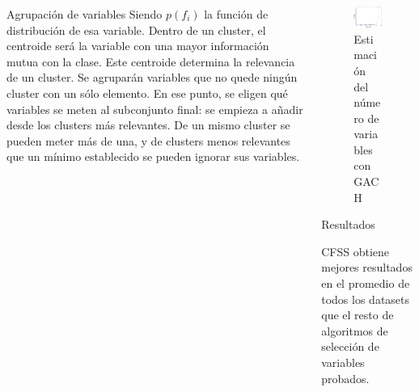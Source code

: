 \documentclass[final]{beamer}
\newlength{\onecolwid}
\newlength{\twocolwid}
\begin{document}
\begin{frame}[t]
\begin{columns}[t]
\begin{column}{\twocolwid}
\begin{columns}[t,totalwidth=\twocolwid]
\begin{column}{\onecolwid}
\begin{block}{Agrupación de variables}
Siendo $p(f_i)$ la función de distribución de esa variable. Dentro de un cluster, el centroide será la variable con una mayor información mutua con la clase. Este centroide determina la relevancia de un cluster.
\newline
\newline
Se agruparán variables que no quede ningún cluster con un sólo elemento. En ese punto, se eligen qué variables se meten al subconjunto final: se empieza a añadir desde los clusters más relevantes. De un mismo cluster se pueden meter más de una, y de clusters menos relevantes que un mínimo establecido se pueden ignorar sus variables.

\end{block}


\end{column} %

\begin{column}{\onecolwid} %
\begin{figure}
\includegraphics[width=0.8\linewidth]{gach.png}
\caption{Estimación del número de variables con GACH}
\end{figure}


\begin{block}{Resultados}



CFSS obtiene mejores resultados en el promedio de todos los datasets que el resto de algoritmos de selección de variables probados.


\end{block}
\end{column}
\end{columns}
\end{column}
\end{columns}
\end{frame}
\end{document}
